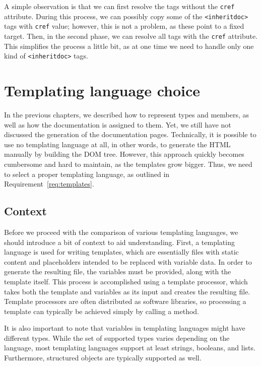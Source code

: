 A simple observation is that we can first resolve the tags without the \texttt{cref} attribute. 
During this process, we can possibly copy some of the \texttt{<inheritdoc>} tags with \texttt{cref} value; however, this is not a problem, as these point to a fixed target.
Then, in the second phase, we can resolve all tags with the \texttt{cref} attribute.
This simplifies the process a little bit, as at one time we need to handle only one kind of \texttt{<inheritdoc>} tags.

\section{Templating language choice}

In the previous chapters, we described how to represent types and members, as well as how the documentation is assigned to them.
Yet, we still have not discussed the generation of the documentation pages.
Technically, it is possible to use no templating language at all, in other words, to
generate the HTML manually by building the DOM tree. However, this approach
quickly becomes cumbersome and hard to maintain, as the templates grow bigger.
Thus, we need to select a proper templating language, as outlined in Requirement~\ref{req:templates}.

\subsection*{Context}

Before we proceed with the comparison of various templating languages, we should introduce a bit of context to aid understanding.
First, a templating language is used for writing templates, which are essentially files with static content and placeholders intended to be replaced with variable data. 
In order to generate the resulting file, the variables must be provided, along with the template itself.
This process is accomplished using a template processor, which takes both the template and variables as its input and creates the resulting file.
Template processors are often distributed as software libraries, so processing a template can typically be achieved simply by calling a method.

It is also important to note that variables in templating languages might have different types.
While the set of supported types varies depending on the language, most templating languages support at least strings, booleans, and lists.
Furthermore, structured objects are typically supported as well.

